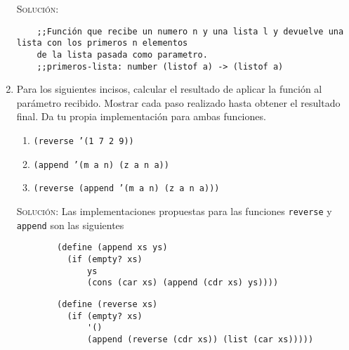 \documentclass[letterpaper,11pt]{article}
\begin{document}
\begin{enumerate}
    \textsc{Solución:} 
    
    \begin{verbatim}
    ;;Función que recibe un numero n y una lista l y devuelve una lista con los primeros n elementos 
    de la lista pasada como parametro.
    ;;primeros-lista: number (listof a) -> (listof a)
    \end{verbatim}
	
    \item Para los siguientes incisos, calcular el resultado de aplicar la 
    función al parámetro recibido. Mostrar cada paso realizado hasta obtener el 
    resultado final. Da tu propia implementación para ambas funciones.
    \begin{enumerate}
        \item \texttt{(reverse '(1 7 2 9))}
        \item \texttt{(append '(m a n) (z a n a))}
        \item \texttt{(reverse (append '(m a n) (z a n a)))}
    \end{enumerate} 

    \textsc{Solución:} Las implementaciones propuestas para las funciones 
    \texttt{reverse} y \texttt{append} son las siguientes 
    \begin{verbatim}
        (define (append xs ys)
          (if (empty? xs)
              ys
              (cons (car xs) (append (cdr xs) ys))))
    \end{verbatim}
    \begin{verbatim}
        (define (reverse xs)
          (if (empty? xs)
              '()
              (append (reverse (cdr xs)) (list (car xs)))))
    \end{verbatim}


\end{enumerate}
\end{document}
